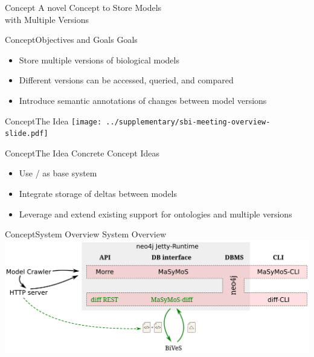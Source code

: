 \begin{frame}{Concept}{}
	\centering
	\LARGE A novel Concept to Store Models\\ with Multiple Versions
\end{frame}

\begin{frame}{Concept}{Objectives and Goals}
	{\LARGE Goals}
	\\[2.5em]
	\large
	\begin{itemize}
		\item Store multiple versions of biological models
		\item Different versions can be accessed, queried, and compared
		\item Introduce semantic annotations of changes between model versions
	\end{itemize}
\end{frame}

\begin{frame}{Concept}{The Idea}
	\centering
	\texttt{[image: ../supplementary/sbi-meeting-overview-slide.pdf]}
\end{frame}

\begin{frame}{Concept}{The Idea}
	{\Large Concrete Concept Ideas}
	\\[2.5em]
	\begin{itemize}
		\item Use \neoj/\masymos \citep{Henkel2015} as base system
		\item Integrate storage of deltas between models
		\item Leverage and extend existing support for ontologies and multiple versions
	\end{itemize}
\end{frame}

\begin{frame}{Concept}{System Overview}
	{\LARGE System Overview}
	\\[2.5em]
	\centering
	\vfill
	\includegraphics[width=\linewidth,height=\textheight,keepaspectratio]{../tex/resources/system-overview-matrix.pdf}
	\vfill
\end{frame}

